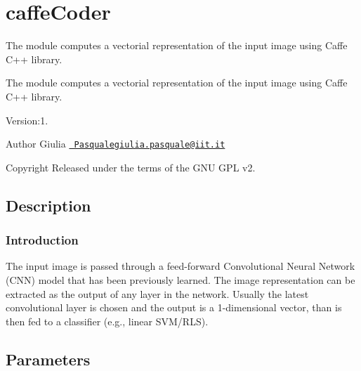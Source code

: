 \section{caffe\+Coder}
\label{group__caffeCoder}


The module computes a vectorial representation of the input image using Caffe C++ library.  


The module computes a vectorial representation of the input image using Caffe C++ library. 

Version\+:1. \begin{DoxyAuthor}{Author}
Giulia \href{mailto:Pasqualegiulia.pasquale@iit.it}{\texttt{ Pasqualegiulia.\+pasquale@iit.\+it}} ~\newline
 
\end{DoxyAuthor}
\begin{DoxyCopyright}{Copyright}
Released under the terms of the G\+NU G\+PL v2. 
\end{DoxyCopyright}
\hypertarget{group__GIECoder_intro_sec}{}\subsection{Description}\label{group__GIECoder_intro_sec}
\hypertarget{group__GIECoder_sec-intro}{}\subsubsection{Introduction}\label{group__GIECoder_sec-intro}
The input image is passed through a feed-\/forward Convolutional Neural Network (C\+NN) model that has been previously learned. The image representation can be extracted as the output of any layer in the network. Usually the latest convolutional layer is chosen and the output is a 1-\/dimensional vector, than is then fed to a classifier (e.\+g., linear S\+V\+M/\+R\+LS).\hypertarget{group__GIECoder_parameters_sec}{}\subsection{Parameters}\label{group__GIECoder_parameters_sec}

